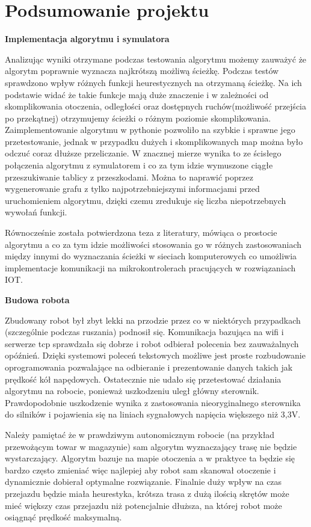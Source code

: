 \section{Podsumowanie projektu}

\textbf{Implementacja algorytmu i symulatora}

Analizując wyniki otrzymane podczas testowania algorytmu możemy zauważyć że algorytm poprawnie wyznacza 
najkrótszą możliwą ścieżkę. Podczas testów sprawdzono wpływ różnych funkcji heurestycznych na otrzymaną ścieżkę.
Na ich podstawie widać że takie funkcje mają duże znaczenie i w zależności od skomplikowania
otoczenia, odległości oraz dostępnych ruchów(możliwość przejścia po przekątnej) otrzymujemy ścieżki o różnym poziomie skomplikowania.
Zaimplementowanie algorytmu w pythonie pozwoliło na szybkie i sprawne jego przetestowanie, jednak w przypadku dużych i skomplikowanych map 
można było odczuć coraz dłuższe przeliczanie. W znacznej mierze wynika to ze ścisłego połączenia algorytmu z symulatorem i co za tym idzie wymuszone 
ciągłe przeszukiwanie tablicy z przeszkodami. Można to naprawić poprzez wygenerowanie grafu z tylko
najpotrzebniejszymi informacjami przed uruchomieniem algorytmu, dzięki czemu zredukuje się liczba niepotrzebnych wywołań funkcji.

Równocześnie została potwierdzona teza z literatury, mówiąca o prostocie algorytmu a co za tym idzie możliwości
stosowania go w różnych zastosowaniach między innymi do wyznaczania ścieżki w sieciach komputerowych co umożliwia 
implementacje komunikacji na mikrokontrolerach pracujących w rozwiązaniach IOT. 

\textbf{Budowa robota}

Zbudowany robot był zbyt lekki na przodzie przez co w niektórych przypadkach (szczególnie podczas ruszania) podnosił się. Komunikacja bazująca na 
wifi i serwerze tcp sprawdzała się dobrze i robot odbierał polecenia bez zauważalnych opóźnień. Dzięki systemowi poleceń tekstowych możliwe jest 
proste rozbudowanie oprogramowania pozwalające na odbieranie i prezentowanie danych takich jak prędkość kół napędowych. Ostatecznie nie udało się przetestować 
działania algorytmu na robocie, ponieważ uszkodzeniu uległ główny sterownik. Prawdopodobnie uszkodzenie wynika z zastosowania nieoryginalnego 
sterownika do silników i pojawienia się na liniach sygnałowych napięcia większego niż 3,3V. 

Należy pamiętać że w prawdziwym autonomicznym robocie (na przykład przewożącym towar w magazynie) sam algorytm wyznaczający trasę nie będzie wystarczający. 
Algorytm bazuje na mapie otoczenia a w praktyce ta będzie się bardzo często zmieniać więc najlepiej aby robot sam skanował otoczenie
i dynamicznie dobierał optymalne rozwiązanie. Finalnie duży wpływ na czas przejazdu będzie miała heurestyka, krótsza trasa z dużą ilością skrętów może mieć 
większy czas przejazdu niż potencjalnie dłuższa, na której robot może osiągnąć prędkość maksymalną. 